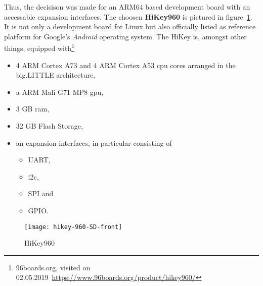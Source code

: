 Thus, the decisison was made for an ARM64 based development board with an accessable expansion interfaces.
The choosen \textbf{HiKey960} is pictured in figure~\ref{pic:hikey}.
It is not only a development board for Linux but also officially listed as reference platform for Google's \textit{Android} operating system.
The HiKey is, amongst other things, equipped with\footnote{96boards.org, visited on 02.05.2019~\url{https://www.96boards.org/product/hikey960/}}
\begin{itemize}
    \item 4 ARM Cortex A73 and 4 ARM Cortex A53 \ac{cpu} cores arranged in the big.LITTLE architecture,
    \item a ARM Mali G71 MP8 \ac{gpu},
    \item 3 GB \ac{ram},
    \item 32 GB Flash Storage,
    \item an expansion interfaces, in particular consisting of
        \begin{itemize}
            \item UART,
            \item \ac{i2c},
            \item SPI and
            \item GPIO.
        \end{itemize}
\end{itemize}

\begin{figure} [t]
    \centering
    \texttt{[image: hikey-960-SD-front]}
    \caption{HiKey960}\label{pic:hikey}
\end{figure}

